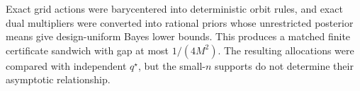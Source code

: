 Exact grid actions were barycentered into deterministic orbit rules, and exact dual multipliers were converted into rational priors whose unrestricted posterior means give design-uniform Bayes lower bounds.  This produces a matched finite certificate sandwich with gap at most \(1/(4M^2)\).  The resulting allocations were compared with independent \(q^\star\), but the small-\(n\) supports do not determine their asymptotic relationship.